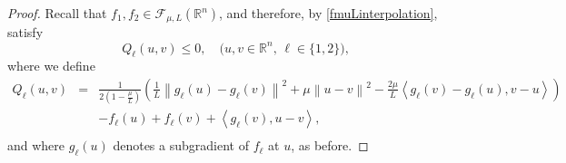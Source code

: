 \documentclass{article} %
\begin{document}
\begin{proof}
Recall that  $f_1,f_2 \in \mathcal{F}_{\mu,L}(\mathbb{R}^n)$, and therefore, by \eqref{fmuLinterpolation}, satisfy
\begin{equation}
Q_\ell(u,v) \le 0, \quad \mbox{($u,v \in \mathbb{R}^n$,   $\ell \in \{1,2\}$)},
\label{eq:interpolation constraints}
\end{equation}
where we define
\begin{eqnarray*}
Q_\ell(u,v) &=& \tfrac{1}{2(1-\tfrac{\mu}{L})}\left(\tfrac{1}{L}\left\|g_{\ell}(u)-g_{\ell}(v)\right\|^2+\mu\left\|u-v\right\|^2
 -\tfrac{2\mu}{L}\left\langle g_{\ell}(v)-g_{\ell}(u),v-u\right\rangle\right)  \\
&& - f_{\ell}(u)+f_{\ell}(v)+\left\langle g_{\ell}(v), u-v\right\rangle, \\
\end{eqnarray*}
and where $g_\ell(u)$ denotes a subgradient of $f_\ell$ at $u$, as before.


\end{proof}
\end{document}
